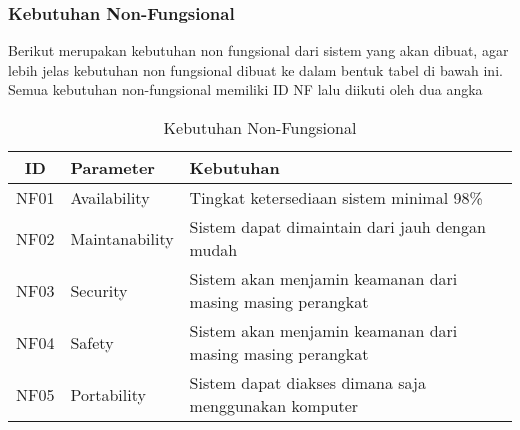 \subsubsection{Kebutuhan Non-Fungsional}
Berikut merupakan kebutuhan non fungsional dari sistem yang akan dibuat, agar lebih jelas kebutuhan non fungsional dibuat ke dalam bentuk tabel di bawah ini. Semua kebutuhan non-fungsional memiliki ID NF lalu diikuti oleh dua angka
\begin{table}[h]
  \caption{Kebutuhan Non-Fungsional}
  \label{tab:kebutuhan-non-fungsional}
  \centering
  \begin{tabular}{|c|p{3cm}|p{8cm}|}
    \hline
    ID   & Parameter      & Kebutuhan                                                  \\
    \hline
    NF01 & Availability   & Tingkat ketersediaan sistem minimal 98\%                   \\
    \hline
    NF02 & Maintanability & Sistem dapat dimaintain dari jauh dengan mudah             \\
    \hline
    NF03 & Security       & Sistem akan menjamin keamanan dari masing masing perangkat \\
    \hline
    NF04 & Safety         & Sistem akan menjamin keamanan dari masing masing perangkat \\
    \hline
    NF05 & Portability    & Sistem dapat diakses dimana saja menggunakan komputer      \\
    \hline
  \end{tabular}
\end{table}